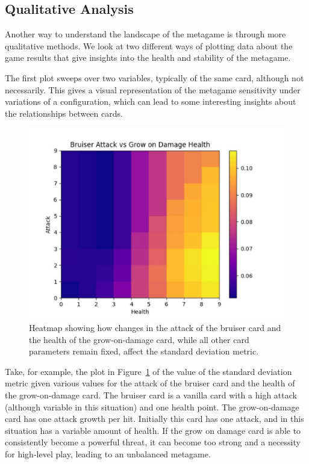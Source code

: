 \documentclass[letterpaper]{article} %
\begin{document}
\subsection{Qualitative Analysis} \label{sec:qualitative-analysis}

Another way to understand the landscape of the metagame is through more qualitative methods. We look at two different ways of plotting data about the game results that give insights into the health and stability of the metagame. 

The first plot sweeps over two variables, typically of the same card, although not necessarily. This gives a visual representation of the metagame sensitivity under variations of a configuration, which can lead to some interesting insights about the relationships between cards.

\begin{figure}[t]
        \centering
	\includegraphics[scale=0.51]{bruiser_vs_grow} 
	\caption{Heatmap showing how changes in the attack of the bruiser card and the health of the grow-on-damage card, while all other card parameters remain fixed, affect the standard deviation metric.}
	\label{fig:bruiser_vs_grow}
\end{figure}

Take, for example, the plot in Figure~\ref{fig:bruiser_vs_grow} of the value of the standard deviation metric given various values for the attack of the bruiser card and the health of the grow-on-damage card. The bruiser card is a vanilla card with a high attack (although variable in this situation) and one health point. The grow-on-damage card has one attack growth per hit. Initially this card has one attack, and in this situation has a variable amount of health. If the grow on damage card is able to consistently become a powerful threat, it can become too strong and a necessity for high-level play, leading to an unbalanced metagame.
\end{document}
